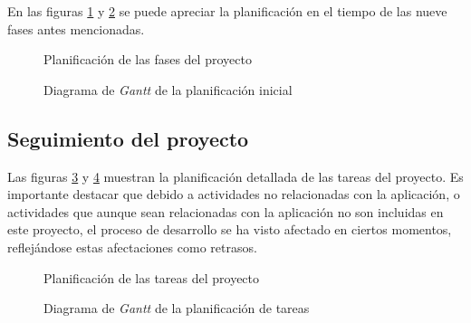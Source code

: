         En las figuras \ref{fig:gantt-initial-tasks} y \ref{fig:gantt-initial-diagram} se puede apreciar la planificación en el tiempo de las nueve fases antes mencionadas.
        
        \begin{figure}[H]
        \centering
            \caption{Planificación de las fases del proyecto}
            \label{fig:gantt-initial-tasks}
        \end{figure}
        
        \begin{figure}[H]
        \centering
            \caption{Diagrama de \textit{Gantt} de la planificación inicial}
            \label{fig:gantt-initial-diagram}
        \end{figure}
        
    \subsection{Seguimiento del proyecto}
        
        Las figuras \ref{fig:gantt-followup-tasks} y \ref{fig:gantt-followup-diagram} muestran la planificación detallada de las tareas del proyecto. Es importante destacar que debido a actividades no relacionadas con la aplicación, o actividades que aunque sean relacionadas con la aplicación no son incluidas en este proyecto, el proceso de desarrollo se ha visto afectado en ciertos momentos, reflejándose estas afectaciones como retrasos.
        
        \begin{figure}[H]
        \centering
            \caption{Planificación de las tareas del proyecto}
            \label{fig:gantt-followup-tasks}
        \end{figure}
    
        \begin{figure}[H]
        \centering
            \caption{Diagrama de \textit{Gantt} de la planificación de tareas}
            \label{fig:gantt-followup-diagram}
        \end{figure}